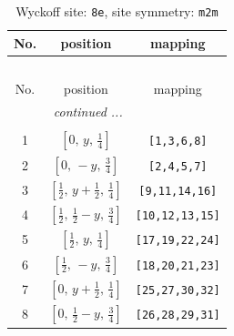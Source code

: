 \documentclass[fleqn,8pt]{jsarticle}
\begin{document}
\begin{longtable}{ccc}
\caption{Wyckoff site: {\tt 8e}, site symmetry: {\tt m2m}}
 \\
 \hline \hline
No. & position & mapping \\ \hline \endfirsthead

\multicolumn{2}{l}{\tablename\ \thetable{}} \\
 \hline \hline
No. & position & mapping \\ \hline \endhead

 \hline \hline
\multicolumn{2}{r}{\footnotesize\it continued ...} \\ \endfoot

 \hline \hline
\multicolumn{2}{r}{} \\ \endlastfoot

1 & $\left[ 0,\, y,\, \frac{1}{4} \right]$ & {\tt [1,3,6,8]} \\ \hline
2 & $\left[ 0,\, - y,\, \frac{3}{4} \right]$ & {\tt [2,4,5,7]} \\ \hline
3 & $\left[ \frac{1}{2},\, y + \frac{1}{2},\, \frac{1}{4} \right]$ & {\tt [9,11,14,16]} \\ \hline
4 & $\left[ \frac{1}{2},\, \frac{1}{2} - y,\, \frac{3}{4} \right]$ & {\tt [10,12,13,15]} \\ \hline
5 & $\left[ \frac{1}{2},\, y,\, \frac{1}{4} \right]$ & {\tt [17,19,22,24]} \\ \hline
6 & $\left[ \frac{1}{2},\, - y,\, \frac{3}{4} \right]$ & {\tt [18,20,21,23]} \\ \hline
7 & $\left[ 0,\, y + \frac{1}{2},\, \frac{1}{4} \right]$ & {\tt [25,27,30,32]} \\ \hline
8 & $\left[ 0,\, \frac{1}{2} - y,\, \frac{3}{4} \right]$ & {\tt [26,28,29,31]} \\
\end{longtable}
\renewcommand{\arraystretch}{1.2}
\end{document}
